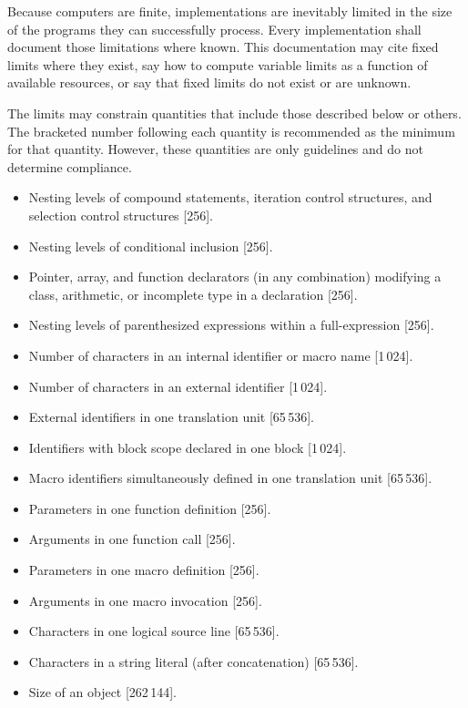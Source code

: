 
\pnum
Because computers are finite, \Cpp  implementations are inevitably
limited in the size of the programs they can successfully process.
Every implementation shall
document those limitations where known.
This documentation may cite fixed limits where they
exist, say how to compute variable limits as a function
of available resources, or say that fixed limits do not exist
or are unknown.

\pnum
The limits may constrain quantities
that include those described below or others.
The bracketed number following each quantity is recommended
as the minimum for that quantity.
However, these quantities are only guidelines and do not determine compliance.
\begin{itemize}
\item%
Nesting levels of compound statements,
iteration control structures,
and selection control structures [256].
\item%
Nesting levels of conditional inclusion [256].
\item%
Pointer, array, and function declarators
(in any combination)
modifying a class, arithmetic,
or incomplete type in a declaration [256].
\item%
Nesting levels of parenthesized expressions within a full-expression [256].
\item%
Number of
characters in an internal identifier
or macro name [1\,024].
\item%
Number of
characters in an external identifier [1\,024].
\item%
External identifiers in one translation unit [65\,536].
\item%
Identifiers with block scope declared in one block [1\,024].
\item%
Macro identifiers simultaneously defined in one
translation
unit [65\,536].
\item%
Parameters in one function definition [256].
\item%
Arguments in one function call [256].
\item%
Parameters in one macro definition [256].
\item%
Arguments in one macro invocation [256].
\item%
Characters in one logical source line [65\,536].
\item%
Characters in a string literal
(after concatenation) [65\,536].
\item%
Size of an object [262\,144].

\end{itemize}
